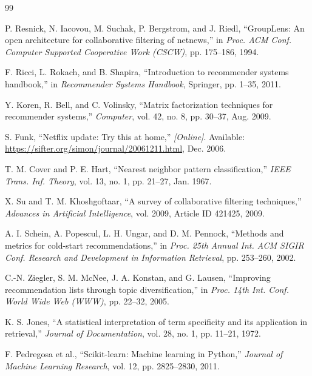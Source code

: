\documentclass[12pt, a4paper]{article}
\begin{document}
\newpage
\begin{thebibliography}{99}

P. Resnick, N. Iacovou, M. Suchak, P. Bergstrom, and J. Riedl,
``GroupLens: An open architecture for collaborative filtering of netnews,''
in \textit{Proc. ACM Conf. Computer Supported Cooperative Work (CSCW)},
pp. 175--186, 1994.

F. Ricci, L. Rokach, and B. Shapira,
``Introduction to recommender systems handbook,''
in \textit{Recommender Systems Handbook}, Springer, pp. 1--35, 2011.

Y. Koren, R. Bell, and C. Volinsky,
``Matrix factorization techniques for recommender systems,''
\textit{Computer}, vol. 42, no. 8, pp. 30--37, Aug. 2009.

S. Funk,
``Netflix update: Try this at home,''
\textit{[Online]}. Available: \url{https://sifter.org/simon/journal/20061211.html}, Dec. 2006.

T. M. Cover and P. E. Hart,
``Nearest neighbor pattern classification,''
\textit{IEEE Trans. Inf. Theory}, vol. 13, no. 1, pp. 21--27, Jan. 1967.

X. Su and T. M. Khoshgoftaar,
``A survey of collaborative filtering techniques,''
\textit{Advances in Artificial Intelligence}, vol. 2009, Article ID 421425, 2009.

A. I. Schein, A. Popescul, L. H. Ungar, and D. M. Pennock,
``Methods and metrics for cold-start recommendations,''
in \textit{Proc. 25th Annual Int. ACM SIGIR Conf. Research and Development in Information Retrieval},
pp. 253--260, 2002.

C.-N. Ziegler, S. M. McNee, J. A. Konstan, and G. Lausen,
``Improving recommendation lists through topic diversification,''
in \textit{Proc. 14th Int. Conf. World Wide Web (WWW)}, pp. 22--32, 2005.

K. S. Jones,
``A statistical interpretation of term specificity and its application in retrieval,''
\textit{Journal of Documentation}, vol. 28, no. 1, pp. 11--21, 1972.

F. Pedregosa et al.,
``Scikit-learn: Machine learning in Python,''
\textit{Journal of Machine Learning Research}, vol. 12, pp. 2825--2830, 2011.

\end{thebibliography}
\end{document}
